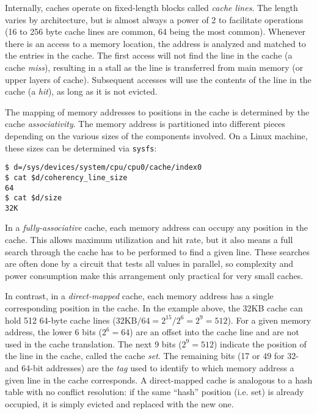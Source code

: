 Internally, caches operate on fixed-length blocks called \textit{cache lines}.
The length varies by architecture, but is almost always a power of 2 to
facilitate operations (16 to 256 byte cache lines are common, 64 being the most
common).  Whenever there is an access to a memory location, the address is
analyzed and matched to the entries in the cache.  The first access will not
find the line in the cache (a cache \textit{miss}), resulting in a stall as the
line is transferred from main memory (or upper layers of cache).  Subsequent
accesses will use the contents of the line in the cache (a \textit{hit}), as
long as it is not evicted.

The mapping of memory addresses to positions in the cache is determined by the
cache \textit{associativity}.  The memory address is partitioned into different
pieces depending on the various sizes of the components involved.  On a Linux
machine, these sizes can be determined via \texttt{sysfs}:

\begin{lstlisting}
$ d=/sys/devices/system/cpu/cpu0/cache/index0
$ cat $d/coherency_line_size
64
$ cat $d/size
32K
\end{lstlisting}

In a \textit{fully-associative} cache, each memory address can occupy any
position in the cache.  This allows maximum utilization and hit rate, but it
also means a full search through the cache has to be performed to find a given
line.  These searches are often done by a circuit that tests all values in
parallel, so complexity and power consumption make this arrangement only
practical for very small caches.

In contrast, in a \textit{direct-mapped} cache, each memory address has a single
corresponding position in the cache.  In the example above, the 32KB cache can
hold 512 64-byte cache lines ($32\text{KB} / 64 = 2^{15} / 2^6 = 2^9 = 512$).
For a given memory address, the lower 6 bits ($2^6 = 64$) are an offset into the
cache line and are not used in the cache translation.  The next 9 bits ($2^9 =
512$) indicate the position of the line in the cache, called the cache
\textit{set}.  The remaining bits (17 or 49 for 32- and 64-bit addresses) are
the \textit{tag} used to identify to which memory address a given line in the
cache corresponds.  A direct-mapped cache is analogous to a hash table with no
conflict resolution: if the same ``hash'' position (i.e. set) is already
occupied, it is simply evicted and replaced with the new one.

